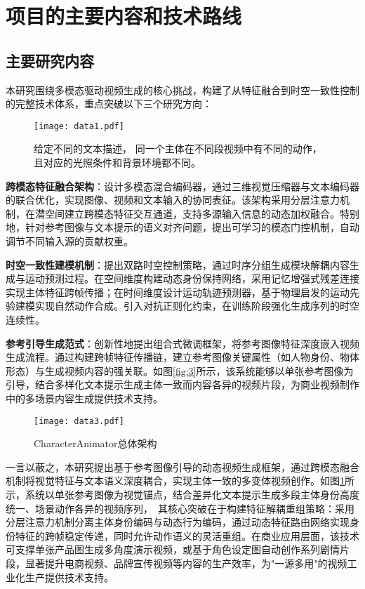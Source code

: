 \section{项目的主要内容和技术路线}

\subsection{主要研究内容}
本研究围绕多模态驱动视频生成的核心挑战，构建了从特征融合到时空一致性控制的完整技术体系，重点突破以下三个研究方向：

\begin{figure}[htbp]
    \centering
    \texttt{[image: data1.pdf]}
    \caption{给定不同的文本描述， 同一个主体在不同段视频中有不同的动作，且对应的光照条件和背景环境都不同。}
    \label{fig:2}
  \end{figure}
\textbf{跨模态特征融合架构}：设计多模态混合编码器，通过三维视觉压缩器与文本编码器的联合优化，实现图像、视频和文本输入的协同表征。该架构采用分层注意力机制，在潜空间建立跨模态特征交互通道，支持多源输入信息的动态加权融合。特别地，针对参考图像与文本提示的语义对齐问题，提出可学习的模态门控机制，自动调节不同输入源的贡献权重。

\textbf{时空一致性建模机制}：提出双路时空控制策略，通过时序分组生成模块解耦内容生成与运动预测过程。在空间维度构建动态身份保持网络，采用记忆增强式残差连接实现主体特征跨帧传播；在时间维度设计运动轨迹预测器，基于物理启发的运动先验建模实现自然动作合成。引入对抗正则化约束，在训练阶段强化生成序列的时空连续性。

\textbf{参考引导生成范式}：创新性地提出组合式微调框架，将参考图像特征深度嵌入视频生成流程。通过构建跨帧特征传播链，建立参考图像关键属性（如人物身份、物体形态）与生成视频内容的强关联。如图\ref{fig:3}所示，该系统能够以单张参考图像为引导，结合多样化文本提示生成主体一致而内容各异的视频片段，为商业视频制作中的多场景内容生成提供技术支持。
\begin{figure}[htbp]
  \centering
  \texttt{[image: data3.pdf]}
  \caption{CharacterAnimator总体架构}
  \label{architecture}
\end{figure}
一言以蔽之，本研究提出基于参考图像引导的动态视频生成框架，通过跨模态融合机制将视觉特征与文本语义深度耦合，实现主体一致的多变体视频创作。如图\ref{fig:2}所示，系统以单张参考图像为视觉锚点，结合差异化文本提示生成多段主体身份高度统一、场景动作各异的视频序列，\
其核心突破在于构建特征解耦重组策略：采用分层注意力机制分离主体身份编码与动态行为编码，通过动态特征路由网络实现身份特征的跨帧稳定传递，同时允许动作语义的灵活重组。在商业应用层面，该技术可支撑单张产品图生成多角度演示视频，或基于角色设定图自动创作系列剧情片段，显著提升电商视频、品牌宣传视频等内容的生产效率，为"一源多用"的视频工业化生产提供技术支持。
